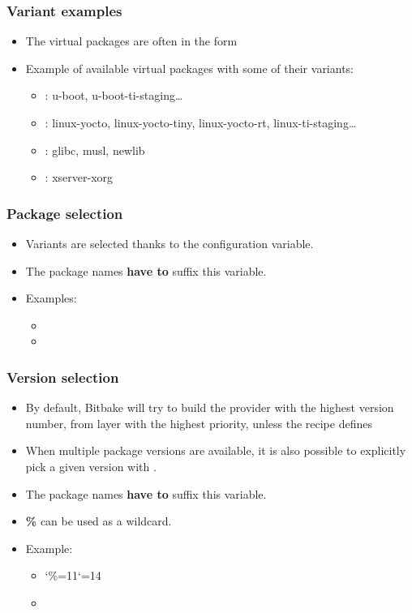 \begin{frame}
  \frametitle{Variant examples}
  \begin{itemize}
    \item The virtual packages are often in the form
    \item Example of available virtual packages with some of their
      variants:
      \begin{itemize}
        \item {}: u-boot,
          u-boot-ti-staging\dots
        \item {}: linux-yocto, linux-yocto-tiny,
          linux-yocto-rt, linux-ti-staging\dots
        \item {}: glibc, musl, newlib
        \item {}: xserver-xorg
      \end{itemize}
  \end{itemize}
\end{frame}

\begin{frame}
  \frametitle{Package selection}
  \begin{itemize}
    \item Variants are selected thanks to the
       configuration variable.
    \item The package names {\bf have to} suffix this variable.
    \item Examples:
    \begin{itemize}
      \item {}
      \item {}
    \end{itemize}
  \end{itemize}
\end{frame}

\begin{frame}
  \frametitle{Version selection}
  \begin{itemize}
    \item By default, Bitbake will try to build the provider with the
      highest version number, from layer with the highest priority, unless the recipe defines
    \item When multiple package versions are available, it is also
      possible to explicitly pick a given version with
      .
    \item The package names {\bf have to} suffix this variable.
    \item {\bf \%} can be used as a wildcard.
    \item Example:
    \begin{itemize}
      \item \catcode`\%=11\catcode`\@=14
      \item {}
    \end{itemize}
  \end{itemize}
\end{frame}

